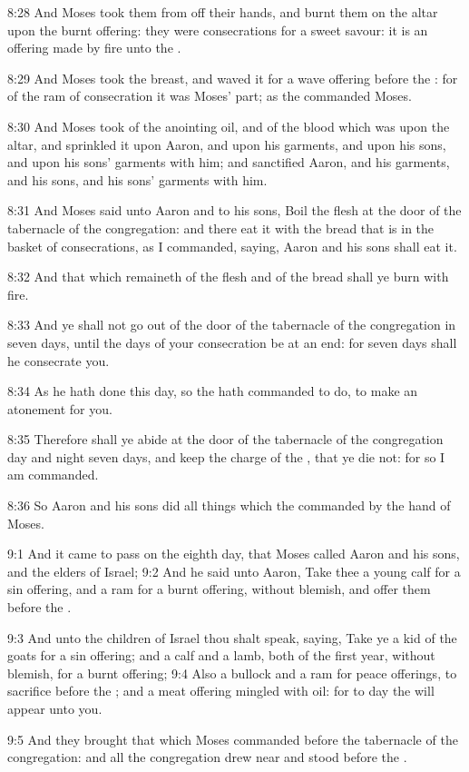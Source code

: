8:28 And Moses took them from off their hands, and burnt them on the
altar upon the burnt offering: they were consecrations for a sweet
savour: it is an offering made by fire unto the \LORD.

8:29 And Moses took the breast, and waved it for a wave offering
before the \LORD: for of the ram of consecration it was Moses' part; as
the \LORD commanded Moses.

8:30 And Moses took of the anointing oil, and of the blood which was
upon the altar, and sprinkled it upon Aaron, and upon his garments,
and upon his sons, and upon his sons' garments with him; and
sanctified Aaron, and his garments, and his sons, and his sons'
garments with him.

8:31 And Moses said unto Aaron and to his sons, Boil the flesh at the
door of the tabernacle of the congregation: and there eat it with the
bread that is in the basket of consecrations, as I commanded, saying,
Aaron and his sons shall eat it.

8:32 And that which remaineth of the flesh and of the bread shall ye
burn with fire.

8:33 And ye shall not go out of the door of the tabernacle of the
congregation in seven days, until the days of your consecration be at
an end: for seven days shall he consecrate you.

8:34 As he hath done this day, so the \LORD hath commanded to do, to
make an atonement for you.

8:35 Therefore shall ye abide at the door of the tabernacle of the
congregation day and night seven days, and keep the charge of the
\LORD, that ye die not: for so I am commanded.

8:36 So Aaron and his sons did all things which the \LORD commanded by
the hand of Moses.

9:1 And it came to pass on the eighth day, that Moses called Aaron and
his sons, and the elders of Israel; 9:2 And he said unto Aaron, Take
thee a young calf for a sin offering, and a ram for a burnt offering,
without blemish, and offer them before the \LORD.

9:3 And unto the children of Israel thou shalt speak, saying, Take ye
a kid of the goats for a sin offering; and a calf and a lamb, both of
the first year, without blemish, for a burnt offering; 9:4 Also a
bullock and a ram for peace offerings, to sacrifice before the \LORD;
and a meat offering mingled with oil: for to day the \LORD will appear
unto you.

9:5 And they brought that which Moses commanded before the tabernacle
of the congregation: and all the congregation drew near and stood
before the \LORD.

